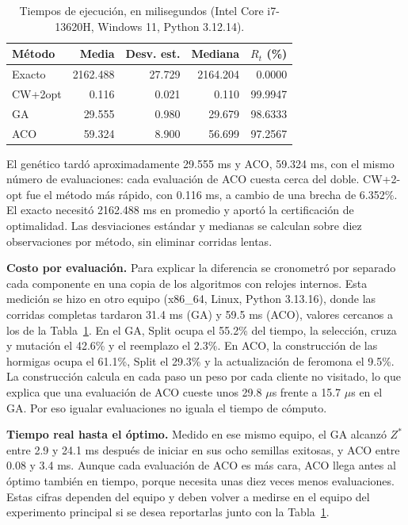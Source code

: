 \documentclass[11pt,a4paper]{article}
\numberwithin{equation}{section}
\begin{document}
\begin{table}[H]\centering\small
\caption{Tiempos de ejecución, en milisegundos (Intel Core i7-13620H, Windows 11, Python 3.12.14).}\label{tab:tiempos}
\begin{tabular}{lrrrr}\toprule
Método & Media & Desv. est. & Mediana & \(R_t\) (\%)\\\midrule
Exacto & 2162.488 & 27.729 & 2164.204 & 0.0000\\
CW+2opt & 0.116 & 0.021 & 0.110 & 99.9947\\
GA & 29.555 & 0.980 & 29.679 & 98.6333\\
ACO & 59.324 & 8.900 & 56.699 & 97.2567\\\bottomrule
\end{tabular}
\end{table}

El genético tardó aproximadamente 29.555 ms y ACO, 59.324 ms, con el mismo número de evaluaciones: cada evaluación de ACO cuesta cerca del doble. CW+2-opt fue el método más rápido, con 0.116 ms, a cambio de una brecha de 6.352\%. El exacto necesitó 2162.488 ms en promedio y aportó la certificación de optimalidad. Las desviaciones estándar y medianas se calculan sobre diez observaciones por método, sin eliminar corridas lentas.

\textbf{Costo por evaluación.} Para explicar la diferencia se cronometró por separado cada componente en una copia de los algoritmos con relojes internos. Esta medición se hizo en otro equipo (x86\_64, Linux, Python 3.13.16), donde las corridas completas tardaron 31.4 ms (GA) y 59.5 ms (ACO), valores cercanos a los de la Tabla~\ref{tab:tiempos}. En el GA, Split ocupa el 55.2\% del tiempo, la selección, cruza y mutación el 42.6\% y el reemplazo el 2.3\%. En ACO, la construcción de las hormigas ocupa el 61.1\%, Split el 29.3\% y la actualización de feromona el 9.5\%. La construcción calcula en cada paso un peso por cada cliente no visitado, lo que explica que una evaluación de ACO cueste unos 29.8 \(\mu\)s frente a 15.7 \(\mu\)s en el GA. Por eso igualar evaluaciones no iguala el tiempo de cómputo.

\textbf{Tiempo real hasta el óptimo.} Medido en ese mismo equipo, el GA alcanzó \(Z^*\) entre 2.9 y 24.1 ms después de iniciar en sus ocho semillas exitosas, y ACO entre 0.08 y 3.4 ms. Aunque cada evaluación de ACO es más cara, ACO llega antes al óptimo también en tiempo, porque necesita unas diez veces menos evaluaciones. Estas cifras dependen del equipo y deben volver a medirse en el equipo del experimento principal si se desea reportarlas junto con la Tabla~\ref{tab:tiempos}.
\end{document}
